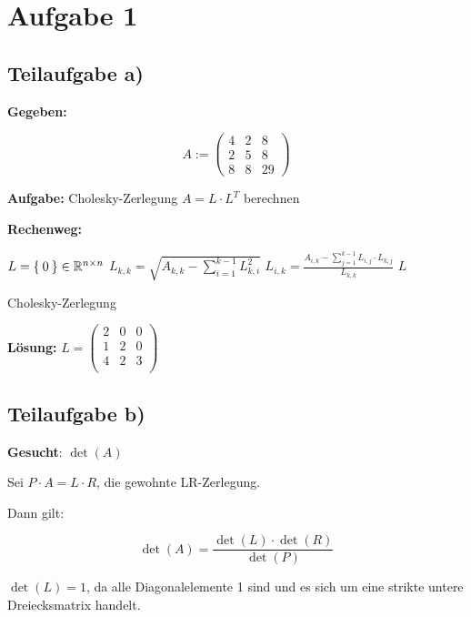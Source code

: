 \section*{Aufgabe 1}
\subsection*{Teilaufgabe a)}

\textbf{Gegeben:}

\[A := \begin{pmatrix}
4 & 2 & 8\\
2 & 5 & 8\\
8 & 8 & 29
\end{pmatrix}\]

\textbf{Aufgabe:} Cholesky-Zerlegung $A = L \cdot L^T$ berechnen

\textbf{Rechenweg:}
\begin{algorithm}[H]
    \begin{algorithmic}
            \State $L = \Set{0} \in \mathbb{R}^{n \times n}$ 
                \State $L_{k,k} = \sqrt{A_{k,k} - \sum_{i=1}^{k-1} L_{k,i}^2}$
                    \State $L_{i,k} = \frac{A_{i,k} - \sum_{j=1}^{k-1} L_{i,j} \cdot L_{k,j}}{L_{k,k}}$
                \EndFor
            \EndFor
            \State \Return $L$
        \EndFunction
    \end{algorithmic}
\caption{Cholesky-Zerlegung}
\label{alg:seq1}
\end{algorithm}

\textbf{Lösung:}
$
L =
\begin{pmatrix}
2 & 0 & 0 \\
1 & 2 & 0 \\
4 & 2 & 3 \\
\end{pmatrix}
$


\subsection*{Teilaufgabe b)}
\textbf{Gesucht}: $\det(A)$

Sei $P \cdot A = L \cdot R$, die gewohnte LR-Zerlegung.

Dann gilt:

\[\det(A) = \frac{\det(L) \cdot \det(R)}{\det(P)}\]

$\det(L) = 1$, da alle Diagonalelemente 1 sind und es sich um eine strikte untere Dreiecksmatrix handelt.

